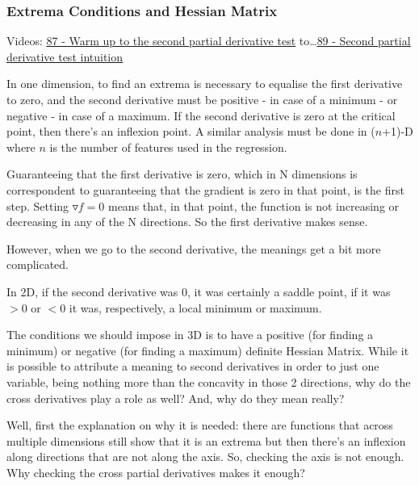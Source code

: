 \subsubsection{Extrema Conditions and Hessian Matrix} \label{sec:Hessian}

Videos: \href{https://www.youtube.com/watch?v=nRJM4mY-Pq0&list=PLSQl0a2vh4HC5feHa6Rc5c0wbRTx56nF7&index=87}{\ul{87 - Warm up to the second partial derivative test}} to\dots \href{https://www.youtube.com/watch?v=sJo7D74PAak&list=PLSQl0a2vh4HC5feHa6Rc5c0wbRTx56nF7&index=89}{\ul{89 - Second partial derivative test intuition}}



In one dimension, to find an extrema is necessary to equalise the first derivative to zero, and the second derivative must be positive - in case of a minimum - or negative - in case of a maximum. If the second derivative is zero at the critical point, then there's an inflexion point. A similar analysis must be done in ($n$+1)-D where $n$ is the number of features used in the regression.

Guaranteeing that the first derivative is zero, which in N dimensions is correspondent to guaranteeing that the gradient is zero in that point, is the first step. Setting $\triangledown f = 0$ means that, in that point, the function is not increasing or decreasing in any of the N directions. So the first derivative makes sense.

However, when we go to the second derivative, the meanings get a bit more complicated.

In 2D, if the second derivative was 0, it was certainly a saddle point, if it was $> 0$ or $< 0$ it was, respectively, a local minimum or maximum.

The conditions we should impose in 3D is to have a positive (for finding a minimum) or negative (for finding a maximum) definite Hessian Matrix. While it is possible to attribute a meaning to second derivatives in order to just one variable, being nothing more than the concavity in those 2 directions, why do the cross derivatives play a role as well? And, why do they mean really?

Well, first the explanation on why it is needed: there are functions that across multiple dimensions still show that it is an extrema but then there's an inflexion along directions that are not along the axis. So, checking the axis is not enough. Why checking the cross partial derivatives makes it enough?

